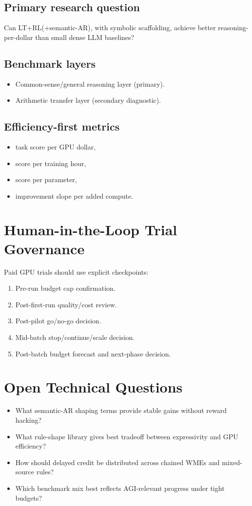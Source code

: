 \documentclass[14pt]{article}
\begin{document}
\subsection{Primary research question}
Can LT+RL(+semantic-AR), with symbolic scaffolding, achieve better reasoning-per-dollar than small dense LLM baselines?

\subsection{Benchmark layers}
\begin{itemize}[leftmargin=1.5em]
  \item Common-sense/general reasoning layer (primary).
  \item Arithmetic transfer layer (secondary diagnostic).
\end{itemize}

\subsection{Efficiency-first metrics}
\begin{itemize}[leftmargin=1.5em]
  \item task score per GPU dollar,
  \item score per training hour,
  \item score per parameter,
  \item improvement slope per added compute.
\end{itemize}

\section{Human-in-the-Loop Trial Governance}
Paid GPU trials should use explicit checkpoints:
\begin{enumerate}[leftmargin=1.5em]
  \item Pre-run budget cap confirmation.
  \item Post-first-run quality/cost review.
  \item Post-pilot go/no-go decision.
  \item Mid-batch stop/continue/scale decision.
  \item Post-batch budget forecast and next-phase decision.
\end{enumerate}

\section{Open Technical Questions}
\begin{itemize}[leftmargin=1.5em]
  \item What semantic-AR shaping terms provide stable gains without reward hacking?
  \item What rule-shape library gives best tradeoff between expressivity and GPU efficiency?
  \item How should delayed credit be distributed across chained WMEs and mixed-source rules?
  \item Which benchmark mix best reflects AGI-relevant progress under tight budgets?
\end{itemize}
\end{document}
